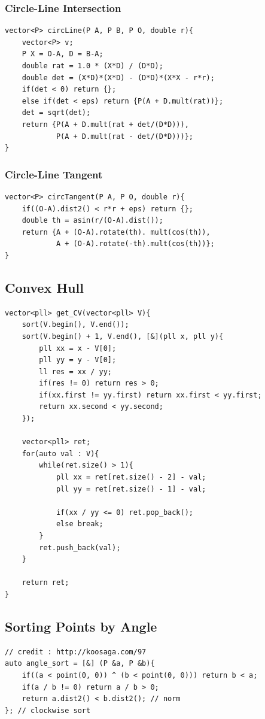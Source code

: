 \documentclass[landscape, 8pt, a4paper, oneside, twocolumn]{extarticle}
\begin{document}
\subsubsection{Circle-Line Intersection}
\begin{verbatim}
vector<P> circLine(P A, P B, P O, double r){
    vector<P> v;
    P X = O-A, D = B-A;
    double rat = 1.0 * (X*D) / (D*D);
    double det = (X*D)*(X*D) - (D*D)*(X*X - r*r);
    if(det < 0) return {};
    else if(det < eps) return {P(A + D.mult(rat))};
    det = sqrt(det);
    return {P(A + D.mult(rat + det/(D*D))), 
            P(A + D.mult(rat - det/(D*D)))};
}
\end{verbatim}
\subsubsection{Circle-Line Tangent}
\begin{verbatim}
vector<P> circTangent(P A, P O, double r){
    if((O-A).dist2() < r*r + eps) return {};
    double th = asin(r/(O-A).dist());
    return {A + (O-A).rotate(th). mult(cos(th)),
            A + (O-A).rotate(-th).mult(cos(th))};
}
\end{verbatim}
\subsection{Convex Hull}
\begin{verbatim}
vector<pll> get_CV(vector<pll> V){
    sort(V.begin(), V.end());
    sort(V.begin() + 1, V.end(), [&](pll x, pll y){
        pll xx = x - V[0];
        pll yy = y - V[0];
        ll res = xx / yy;
        if(res != 0) return res > 0;
        if(xx.first != yy.first) return xx.first < yy.first;
        return xx.second < yy.second;
    });

    vector<pll> ret;
    for(auto val : V){
        while(ret.size() > 1){
            pll xx = ret[ret.size() - 2] - val;
            pll yy = ret[ret.size() - 1] - val;

            if(xx / yy <= 0) ret.pop_back();
            else break;
        }
        ret.push_back(val);
    }

    return ret;
}
\end{verbatim}
\subsection{Sorting Points by Angle}
\begin{verbatim}
// credit : http://koosaga.com/97
auto angle_sort = [&] (P &a, P &b){
    if((a < point(0, 0)) ^ (b < point(0, 0))) return b < a;
    if(a / b != 0) return a / b > 0;
    return a.dist2() < b.dist2(); // norm
}; // clockwise sort
\end{verbatim}
\end{document}
